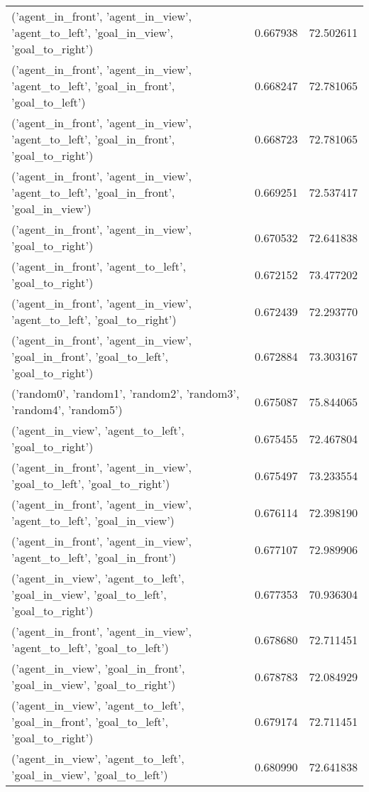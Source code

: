\begin{tabular}{lrr}
('agent\_in\_front', 'agent\_in\_view', 'agent\_to\_left', 'goal\_in\_view', 'goal\_to\_right') & 0.667938 & 72.502611 \\
('agent\_in\_front', 'agent\_in\_view', 'agent\_to\_left', 'goal\_in\_front', 'goal\_to\_left') & 0.668247 & 72.781065 \\
('agent\_in\_front', 'agent\_in\_view', 'agent\_to\_left', 'goal\_in\_front', 'goal\_to\_right') & 0.668723 & 72.781065 \\
('agent\_in\_front', 'agent\_in\_view', 'agent\_to\_left', 'goal\_in\_front', 'goal\_in\_view') & 0.669251 & 72.537417 \\
('agent\_in\_front', 'agent\_in\_view', 'goal\_to\_right') & 0.670532 & 72.641838 \\
('agent\_in\_front', 'agent\_to\_left', 'goal\_to\_right') & 0.672152 & 73.477202 \\
('agent\_in\_front', 'agent\_in\_view', 'agent\_to\_left', 'goal\_to\_right') & 0.672439 & 72.293770 \\
('agent\_in\_front', 'agent\_in\_view', 'goal\_in\_front', 'goal\_to\_left', 'goal\_to\_right') & 0.672884 & 73.303167 \\
('random0', 'random1', 'random2', 'random3', 'random4', 'random5') & 0.675087 & 75.844065 \\
('agent\_in\_view', 'agent\_to\_left', 'goal\_to\_right') & 0.675455 & 72.467804 \\
('agent\_in\_front', 'agent\_in\_view', 'goal\_to\_left', 'goal\_to\_right') & 0.675497 & 73.233554 \\
('agent\_in\_front', 'agent\_in\_view', 'agent\_to\_left', 'goal\_in\_view') & 0.676114 & 72.398190 \\
('agent\_in\_front', 'agent\_in\_view', 'agent\_to\_left', 'goal\_in\_front') & 0.677107 & 72.989906 \\
('agent\_in\_view', 'agent\_to\_left', 'goal\_in\_view', 'goal\_to\_left', 'goal\_to\_right') & 0.677353 & 70.936304 \\
('agent\_in\_front', 'agent\_in\_view', 'agent\_to\_left', 'goal\_to\_left') & 0.678680 & 72.711451 \\
('agent\_in\_view', 'goal\_in\_front', 'goal\_in\_view', 'goal\_to\_right') & 0.678783 & 72.084929 \\
('agent\_in\_view', 'agent\_to\_left', 'goal\_in\_front', 'goal\_to\_left', 'goal\_to\_right') & 0.679174 & 72.711451 \\
('agent\_in\_view', 'agent\_to\_left', 'goal\_in\_view', 'goal\_to\_left') & 0.680990 & 72.641838 \\

\end{tabular}
